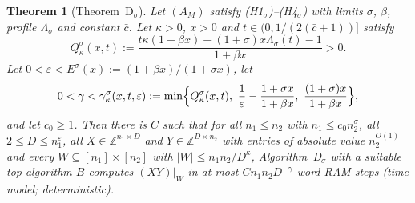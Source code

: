 \documentclass[11pt]{article}
\newtheorem{theorem}{Theorem}[section]
\theoremstyle{definition}
\theoremstyle{remark}
\providecommand{\eps}{\varepsilon}
\providecommand{\Z}{\mathbb{Z}}
\newcommand{\abs}[1]{\lvert #1\rvert}
\newcommand{\Lam}{\Lambda}                    %
\newcommand{\cbar}{\bar c}                    %
\newcommand{\Hscond}[1]{\textup{(H#1$_\sigma$)}} %
\newcommand{\ThmDsig}{Theorem~D\texorpdfstring{\ensuremath{_\sigma}}{\_sigma}}   %
\newcommand{\Qgain}[2]{Q^{#1}_{#2}}           %
\newcommand{\Erange}[1]{E^{#1}}               %
\newcommand{\gbound}[2]{\gamma^{#1}_{#2}}     %
\begin{document}
\begin{theorem}[\ThmDsig]\label{cp:E3}
Let $(A_M)$ satisfy \Hscond1--\Hscond4{} with limits $\sigma$, $\beta$, profile $\Lam_\sigma$ and constant $\cbar$. Let $\kappa>0$, $x>0$ and $t\in(0,1/(2(\cbar+1))]$ satisfy
\[
\Qgain\sigma\kappa(x,t):=\frac{t\kappa(1+\beta x)-(1+\sigma)x\Lam_\sigma(t)-1}{1+\beta x}>0 .
\]
Let $0<\eps<\Erange\sigma(x):=(1+\beta x)/(1+\sigma x)$, let
\[
0<\gamma<\gbound\sigma\kappa(x,t,\eps):=\min\Bigl\{\Qgain\sigma\kappa(x,t),\ \frac1\eps-\frac{1+\sigma x}{1+\beta x},\ \frac{(1+\sigma)x}{1+\beta x}\Bigr\},
\]
and let $c_0\ge1$. Then there is $C$ such that for all $n_1\le n_2$ with $n_1\le c_0n_2^\sigma$, all $2\le D\le n_1^\eps$, all $X\in\Z^{n_1\times D}$ and $Y\in\Z^{D\times n_2}$ with entries of absolute value $n_2^{O(1)}$ and every $W\subseteq[n_1]\times[n_2]$ with $\abs W\le n_1n_2/D^\kappa$, Algorithm~D$_\sigma$ with a suitable top algorithm $B$ computes $(XY)|_W$ in at most $Cn_1n_2D^{-\gamma}$ word-RAM steps (time model; deterministic).
\end{theorem}
\end{document}
